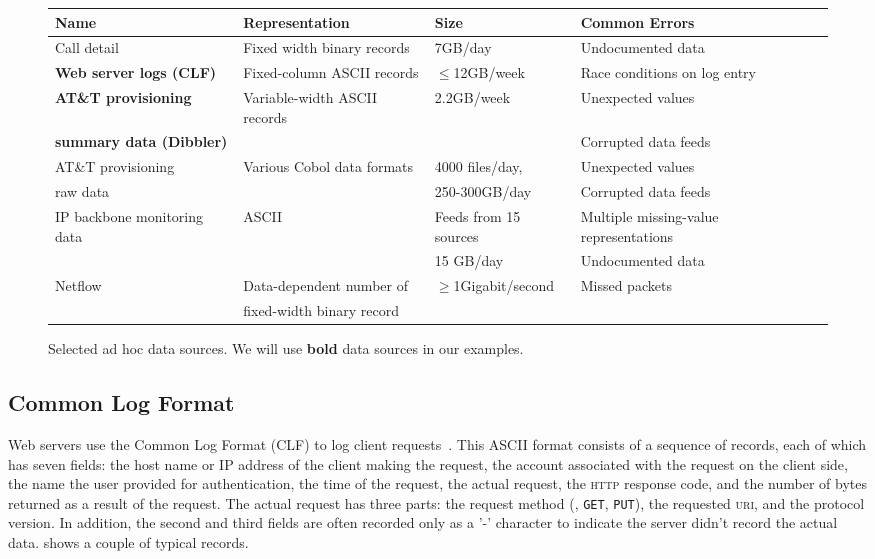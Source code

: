 \documentclass{sig-alternate}
\begin{document}
\begin{figure*}
\begin{center}
\begin{tabular}{|l|l|l|l|l|}
\hline
Name          &  Representation              &Size           & Common Errors \\ \hline\hline
Call detail   &  Fixed width binary records  &\appr{}7GB/day &  Undocumented data\\  \hline 
\textbf{Web server logs (CLF)} &  Fixed-column ASCII records & $\leq$12GB/week & Race conditions on log entry\\ \hline
\textbf{AT\&T provisioning} & Variable-width ASCII records & 2.2GB/week & Unexpected values \\ 
\textbf{summary data (Dibbler)} &                              &            & Corrupted data feeds \\ \hline
AT\&T provisioning  & Various Cobol data formats  & \appr{}4000 files/day, & Unexpected values\\ 
raw data            &                             & 250-300GB/day    & Corrupted data feeds \\ \hline
IP backbone monitoring data  & ASCII  & Feeds from \appr{}15 sources  & Multiple missing-value representations \\
                             &        & \appr{}15 GB/day              & Undocumented data \\ \hline
Netflow       & Data-dependent number of     & $\ge$1Gigabit/second  & Missed packets\\ 
              &  fixed-width binary record   &                       & \\ \hline

\end{tabular}
\label{figure:data-sources}
\caption{Selected ad hoc data sources.  We will use \textbf{bold} data sources in our examples. }
\end{center}
\end{figure*}

\subsection{Common Log Format}
Web servers use the Common Log Format (CLF) to log client
requests~\cite{wpp}.  This ASCII format consists of a sequence of
records, each of which has seven fields: the host name or IP address
of the client making the request, the account associated with the
request on the client side, the name the user provided for
authentication, the time of the request, the actual request, the
\textsc{http} response code, and the number of bytes returned as a
result of the request.  The actual request has three parts: the
request method (\eg, \texttt{GET}, \texttt{PUT}), the requested
\textsc{uri}, and the protocol version.  In addition, the second and
third fields are often recorded only as a '-' character to indicate
the server didn't record the actual data.  
shows a couple of typical records.
\end{document}
